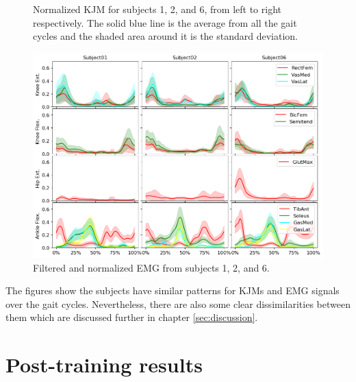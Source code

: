 \documentclass[../main.tex]{subfiles}
\begin{document}
\begin{figure}
\begin{subfigure}[b]{0.325\textwidth}
     \end{subfigure}
    \caption{Normalized \ac{KJM} for subjects 1, 2, and 6, from left to right respectively. The solid blue line is the average from all the gait cycles and the shaded area around it is the standard deviation.}
    \label{fig:kjm-average}
\end{figure}
\begin{figure}
    \centering
    \includegraphics[width=\textwidth]{img/results/emg_avg/all_subject_grid_emg_avg.png}
    \caption{Filtered and normalized \ac{EMG} from subjects 1, 2, and 6.}
    \label{fig:emg-average}
\end{figure}
The figures show the subjects have similar patterns for \acp{KJM} and \ac{EMG} signals over the gait cycles.
Nevertheless, there are also some clear dissimilarities between them which are discussed further in chapter \ref{sec:discussion}.

\section{Post-training results}
\label{sec:post-training-results}
\end{document}
